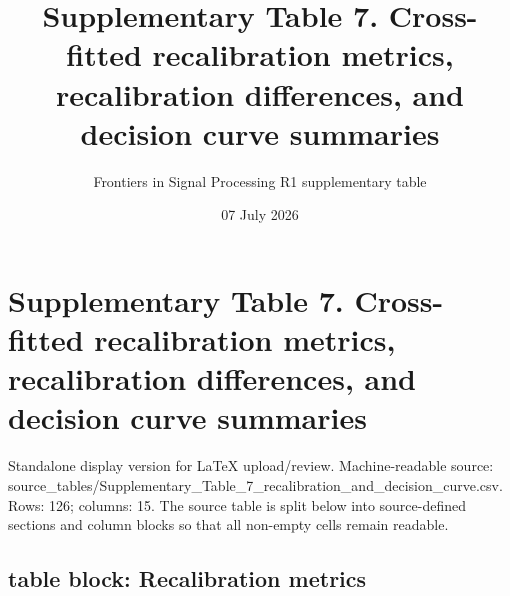 \documentclass[11pt]{article}
\title{Supplementary Table 7. Cross-fitted recalibration metrics, recalibration differences, and decision curve summaries}
\author{Frontiers in Signal Processing R1 supplementary table}
\date{07 July 2026}
\begin{document}
\maketitle

\section*{Supplementary Table 7. Cross-fitted recalibration metrics, recalibration differences, and decision curve summaries}

Standalone display version for LaTeX upload/review. Machine-readable source: source\_\allowbreak{}tables/\allowbreak{}Supplementary\_\allowbreak{}Table\_\allowbreak{}7\_\allowbreak{}recalibration\_\allowbreak{}and\_\allowbreak{}decision\_\allowbreak{}curve.\allowbreak{}csv. Rows: 126; columns: 15. The source table is split below into source-defined sections and column blocks so that all non-empty cells remain readable.

\subsection*{table block: Recalibration metrics}
\end{document}
